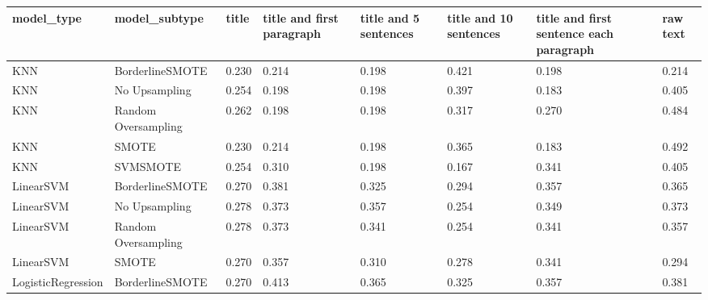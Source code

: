 \begin{tabular}{llllllll}
\toprule
                  model\_type &       model\_subtype &     title & title and first paragraph & title and 5 sentences & title and 10 sentences & title and first sentence each paragraph & raw text \\
\midrule
                         KNN &     BorderlineSMOTE &     0.230 &                     0.214 &                 0.198 &                  0.421 &                                   0.198 &    0.214 \\
                         KNN &       No Upsampling &     0.254 &                     0.198 &                 0.198 &                  0.397 &                                   0.183 &    0.405 \\
                         KNN & Random Oversampling &     0.262 &                     0.198 &                 0.198 &                  0.317 &                                   0.270 &    0.484 \\
                         KNN &               SMOTE &     0.230 &                     0.214 &                 0.198 &                  0.365 &                                   0.183 &    0.492 \\
                         KNN &            SVMSMOTE &     0.254 &                     0.310 &                 0.198 &                  0.167 &                                   0.341 &    0.405 \\
                   LinearSVM &     BorderlineSMOTE &     0.270 &                     0.381 &                 0.325 &                  0.294 &                                   0.357 &    0.365 \\
                   LinearSVM &       No Upsampling &     0.278 &                     0.373 &                 0.357 &                  0.254 &                                   0.349 &    0.373 \\
                   LinearSVM & Random Oversampling &     0.278 &                     0.373 &                 0.341 &                  0.254 &                                   0.341 &    0.357 \\
                   LinearSVM &               SMOTE &     0.270 &                     0.357 &                 0.310 &                  0.278 &                                   0.341 &    0.294 \\
          LogisticRegression &     BorderlineSMOTE &     0.270 &                     0.413 &                 0.365 &                  0.325 &                                   0.357 &    0.381 \\

\end{tabular}
